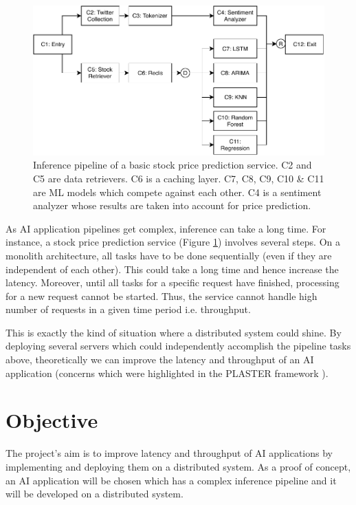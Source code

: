 \documentclass{article}
\begin{document}
\begin{figure}
  \centering
  \includegraphics[width=\textwidth]{StockPriceServiceBasic.pdf}
  \caption{Inference pipeline of a basic stock price prediction service. C2 and C5 are data retrievers. C6 is a caching layer. C7, C8, C9, C10 \& C11 are ML models which compete against each other. C4 is a sentiment analyzer whose results are taken into account for price prediction.}
  \label{fig:StockPriceServiceBasic}
\end{figure}

As AI application pipelines get complex, inference can take a long time. For instance, a stock price prediction service (Figure \ref{fig:StockPriceServiceBasic}) involves several steps. On a monolith architecture, all tasks have to be done sequentially (even if they are independent of each other). This could take a long time and hence increase the latency. Moreover, until all tasks for a specific request have finished, processing for a new request cannot be started. Thus, the service cannot handle high number of requests in a given time period i.e. throughput.

This is exactly the kind of situation where a distributed system could shine. By deploying several servers which could independently accomplish the pipeline tasks above, theoretically we can improve the latency and throughput of an AI application (concerns which were highlighted in the PLASTER framework \cite{Teich2018}).

\section{Objective}
The project's aim is to improve latency and throughput of AI applications by implementing and deploying them on a distributed system. As a proof of concept, an AI application will be chosen which has a complex inference pipeline and it will be developed on a distributed system.
\end{document}
